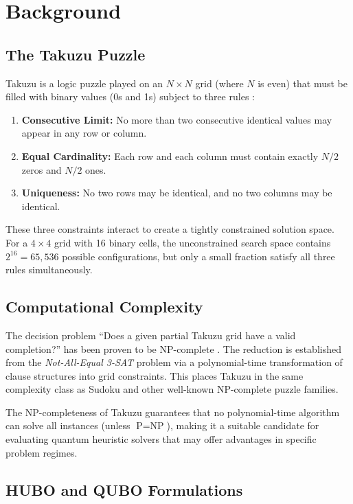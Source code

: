 \documentclass[eng]{ajceam-class}
\begin{document}
\section{Background}

\subsection{The Takuzu Puzzle}

Takuzu is a logic puzzle played on an $N \times N$ grid (where $N$ is even) that must be filled with binary values (0s and 1s) subject to three rules \cite{takuzunp2016}:

\begin{enumerate}
 \item \textbf{Consecutive Limit:} No more than two consecutive identical values may appear in any row or column.
 \item \textbf{Equal Cardinality:} Each row and each column must contain exactly $N/2$ zeros and $N/2$ ones.
 \item \textbf{Uniqueness:} No two rows may be identical, and no two columns may be identical.
\end{enumerate}

These three constraints interact to create a tightly constrained solution space. For a $4 \times 4$ grid with 16 binary cells, the unconstrained search space contains $2^{16} = 65{,}536$ possible configurations, but only a small fraction satisfy all three rules simultaneously.

\subsection{Computational Complexity}

The decision problem ``Does a given partial Takuzu grid have a valid completion?'' has been proven to be NP-complete \cite{takuzunp2016}. The reduction is established from the \emph{Not-All-Equal 3-SAT} problem via a polynomial-time transformation of clause structures into grid constraints. This places Takuzu in the same complexity class as Sudoku \cite{yato2003sudoku} and other well-known NP-complete puzzle families.

The NP-completeness of Takuzu guarantees that no polynomial-time algorithm can solve all instances (unless $\text{P} = \text{NP}$), making it a suitable candidate for evaluating quantum heuristic solvers that may offer advantages in specific problem regimes.

\subsection{HUBO and QUBO Formulations}
\end{document}
